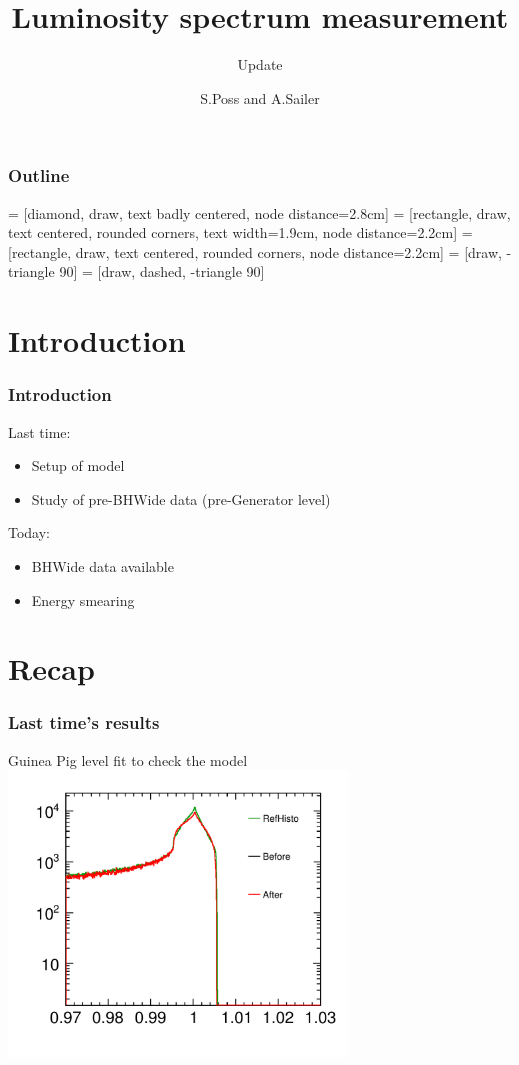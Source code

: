 \documentclass{beamer}
\author{S.Poss and A.Sailer}
\title{Luminosity spectrum measurement}
\subtitle{Update}
\begin{document}
\begin{frame}
\titlepage
\end{frame}
\begin{frame}
\frametitle{Outline}
\tableofcontents
\end{frame}
 = [diamond, draw, text badly centered, node distance=2.8cm]
 = [rectangle, draw, text centered, rounded corners, text width=1.9cm, node distance=2.2cm]
 = [rectangle, draw, text centered, rounded corners, node distance=2.2cm]
 = [draw, -triangle 90]
 = [draw, dashed, -triangle 90]
\section{Introduction}

\begin{frame}
\frametitle{Introduction}
Last time:
\begin{itemize}
  \item Setup of model
  \item Study of pre-BHWide data (pre-Generator level)
\end{itemize}
Today:
\begin{itemize}
  \item BHWide data available
  \item Energy smearing 
\end{itemize}
\end{frame}

\section{Recap}
\begin{frame}
\frametitle{Last time's results}
Guinea Pig level fit to check the model
\includegraphics[width=9cm]{../HistoGrams}
\end{frame}
\end{document}
